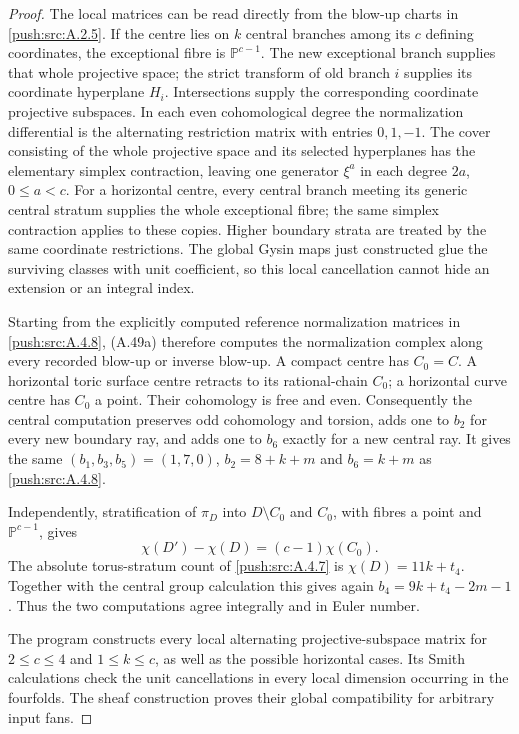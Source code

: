 \begin{proof}
The local matrices can be read directly from the
blow-up charts in \ref{push:src:A.2.5}. If the centre lies on $k$
central branches among its $c$ defining coordinates,
the exceptional fibre is $\mathbb P^{c-1}$. The new
exceptional branch supplies that whole projective
space; the strict transform of old branch $i$
supplies its coordinate hyperplane $H_i$.
Intersections supply the corresponding coordinate
projective subspaces. In each even cohomological
degree the normalization differential is the
alternating restriction matrix with entries
$0,1,-1$. The cover consisting of the whole
projective space and its selected hyperplanes
has the elementary simplex contraction, leaving
one generator $\xi^a$ in each degree $2a$,
$0\leq a<c$. For a horizontal centre, every
central branch meeting its generic central
stratum supplies the whole exceptional fibre;
the same simplex contraction applies to these
copies. Higher boundary strata are treated by
the same coordinate restrictions. The global
Gysin maps just constructed glue the surviving
classes with unit coefficient, so this local
cancellation cannot hide an extension or an
integral index.

Starting from the explicitly computed reference
normalization matrices in \ref{push:src:A.4.8}, (A.49a) therefore
computes the normalization complex along every
recorded blow-up or inverse blow-up. A compact
centre has $C_0=C$. A horizontal toric surface
centre retracts to its rational-chain $C_0$;
a horizontal curve centre has $C_0$ a point.
Their cohomology is free and even. Consequently
the central computation preserves odd cohomology
and torsion, adds one to $b_2$ for every new
boundary ray, and adds one to $b_6$ exactly for
a new central ray. It gives the same
$(b_1,b_3,b_5)=(1,7,0)$,
$b_2=8+k+m$ and $b_6=k+m$ as \ref{push:src:A.4.8}.

Independently, stratification of $\pi_D$ into
$D\setminus C_0$ and $C_0$, with fibres a point
and $\mathbb P^{c-1}$, gives
\[
 \chi(D')-\chi(D)=(c-1)\chi(C_0).
\]
The absolute torus-stratum count of \ref{push:src:A.4.7} is
$\chi(D)=11k+t_4$. Together with the central
group calculation this gives again
$b_4=9k+t_4-2m-1$. Thus the two computations
agree integrally and in Euler number.

The program 
constructs every local alternating projective-subspace
matrix for $2\leq c\leq4$ and $1\leq k\leq c$,
as well as the possible horizontal cases. Its
Smith calculations check the unit cancellations
in every local dimension occurring in the
fourfolds. The sheaf construction proves their
global compatibility for arbitrary input fans.
\end{proof}


